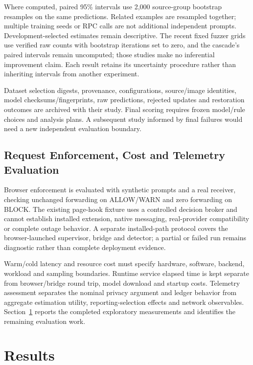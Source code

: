 \documentclass[conference]{IEEEtran}
\begin{document}
Where computed, paired 95\% intervals use 2,000 source-group bootstrap resamples on the same predictions. Related examples are resampled together; multiple training seeds or RPC calls are not additional independent prompts. Development-selected estimates remain descriptive. The recent fixed fuzzer grids use verified raw counts with bootstrap iterations set to zero, and the cascade's paired intervals remain uncomputed; those studies make no inferential improvement claim. Each result retains its uncertainty procedure rather than inheriting intervals from another experiment.

Dataset selection digests, provenance, configurations, source/image identities, model checksums/fingerprints, raw predictions, rejected updates and restoration outcomes are archived with their study. Final scoring requires frozen model/rule choices and analysis plans. A subsequent study informed by final failures would need a new independent evaluation boundary.

\subsection{Request Enforcement, Cost and Telemetry Evaluation}

Browser enforcement is evaluated with synthetic prompts and a real receiver, checking unchanged forwarding on ALLOW/WARN and zero forwarding on BLOCK. The existing page-hook fixture uses a controlled decision broker and cannot establish installed extension, native messaging, real-provider compatibility or complete outage behavior. A separate installed-path protocol covers the browser-launched supervisor, bridge and detector; a partial or failed run remains diagnostic rather than complete deployment evidence.

Warm/cold latency and resource cost must specify hardware, software, backend, workload and sampling boundaries. Runtime service elapsed time is kept separate from browser/bridge round trip, model download and startup costs. Telemetry assessment separates the nominal privacy argument and ledger behavior from aggregate estimation utility, reporting-selection effects and network observables. Section~\ref{sec:results} reports the completed exploratory measurements and identifies the remaining evaluation work.

\section{Results}
\label{sec:results}
\end{document}
